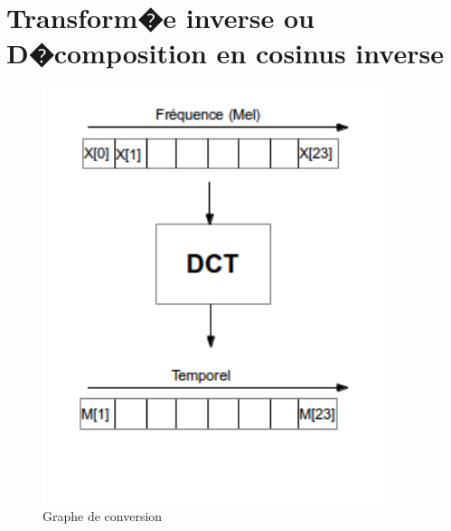		\section{Transform�e inverse ou D�composition en cosinus inverse}
\begin{figure}[H]
	\begin{center}
		\includegraphics[width=10cm]{Images/DCTschema.png} 
	\end{center}
	\caption{Graphe de conversion}
\end{figure}
